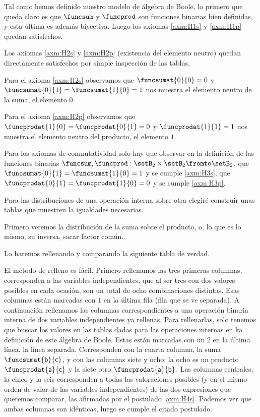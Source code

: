 	Tal como hemos definido nuestro modelo de álgebra de Boole, lo primero
que queda claro es que \(\funcsum\) y \(\funcprod\) son funciones binarias
bien definidas, y esta última es además biyectiva. Luego los axiomas
\ref{axm:H1s} y \ref{axm:H1p} quedan satisfechos. 



	Los axiomas \ref{axm:H2s} y \ref{axm:H2p} (existencia del elemento
neutro) quedan directamente satisfechos por simple inspección de las tablas. 



	Para el axioma \ref{axm:H2s} observamos que \(\funcsumat{0}{0} = 0\) y
\(\funcsumat{0}{1} = \funcsumat{1}{0} = 1\) nos muestra el elemento neutro de
la suma, el elemento \(0\).



	Para el axioma \ref{axm:H2p} observamos que \( \funcprodat{1}{0} =
\funcprodat{0}{1} = 0\) y \(\funcprodat{1}{1} = 1\) nos muestra el elemento
neutro del producto, el elemento \(1\).



	Para los axiomas de conmutatividad solo hay que observar en la definición
de las funciones binarias \(\funcsum,\funcprod : \setB_2 \times \setB_2
\fromto \setB_2\), que \(\funcsumat{0}{1} = \funcsumat{1}{0} = 1\) y se
cumple \ref{axm:H3s}, que \(\funcprodat{0}{1} = \funcprodat{1}{0} = 0\) y se
cumple \ref{axm:H3p}. 



	Para las distribuciones de una operación interna sobre otra elegiré
construir unas tablas que muestren la igualdades necesarias.



	Primero veremos la distribución de la suma sobre el producto, o, lo que
es lo mismo, su inversa, sacar factor común. 



	Lo haremos rellenando y comparando la siguiente tabla de verdad.



	El método de relleno es fácil. Primero rellenamos las tres primeras
columnas, corresponden a las variables independientes, que al ser tres con
dos valores posibles en cada ocasión, son un total de ocho combinaciones
distintas. Esas columnas están marcadas con \(1\) en la última fila (fila que
se ve separada). A continuación rellenamos las columnas correspondientes a
una operación binaria interna de dos variables independientes ya rellenas.
Para rellenarlas, solo tenemos que buscar los valores en las tablas dadas
para las operaciones internas en ka definición de este álgebra de Boole.
Estas están marcadas con un \(2\) en la última línea, la línea separada.
Corresponden con la cuarta columna, la suma \( \funcsumat{ \textsf{b} } {
\textsf{c} } \), y con las columnas siete y ocho: la ocho es un producto
\(\funcprodat{\textsf{a}}{\textsf{c}}\) y la siete otro \( \funcprodat{
\textsf{a} } { \textsf{b} } \). Las columnas centrales, la cinco y la seis
corresponden a todas las valoraciones posibles (y en el mismo orden de valor
de las variables independientes) de las dos expresiones que queremos
comparar, las afirmadas por el postulado \ref{axm:H4s}. Podemos ver que ambas
columnas son idénticas, luego se cumple el citado postulado.



